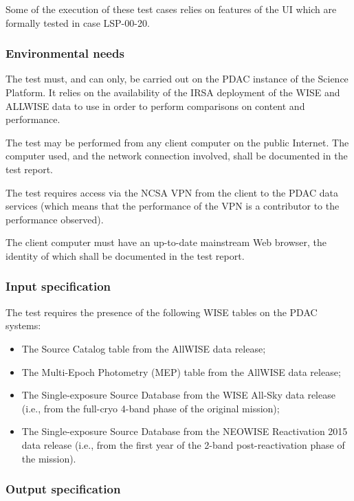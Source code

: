 Some of the execution of these test cases relies on features of the UI which are formally tested in case LSP-00-20.

\subsubsection{Environmental needs}

The test must, and can only, be carried out on the PDAC instance of the Science Platform.
It relies on the availability of the IRSA deployment of the WISE and ALLWISE data to use in order to perform comparisons on content and performance.

The test may be performed from any client computer on the public Internet.
The computer used, and the network connection involved, shall be documented in the test report.

The test requires access via the NCSA VPN from the client to the PDAC data services 
(which means that the performance of the VPN is a contributor to the performance observed).

The client computer must have an up-to-date mainstream Web browser, the identity of which shall be documented in the test report.

\subsubsection{Input specification}

The test requires the presence of the following WISE tables on the PDAC systems:

\begin{itemize}

  \item{The Source Catalog table from the AllWISE data release;}
  \item{The Multi-Epoch Photometry (MEP) table from the AllWISE data release;}
  \item{The Single-exposure Source Database from the WISE All-Sky data release (i.e., from the full-cryo 4-band phase of the original mission);}
  \item{The Single-exposure Source Database from the NEOWISE Reactivation 2015 data release (i.e., from the first year of the 2-band post-reactivation phase of the mission).}
\end{itemize}


\subsubsection{Output specification}

